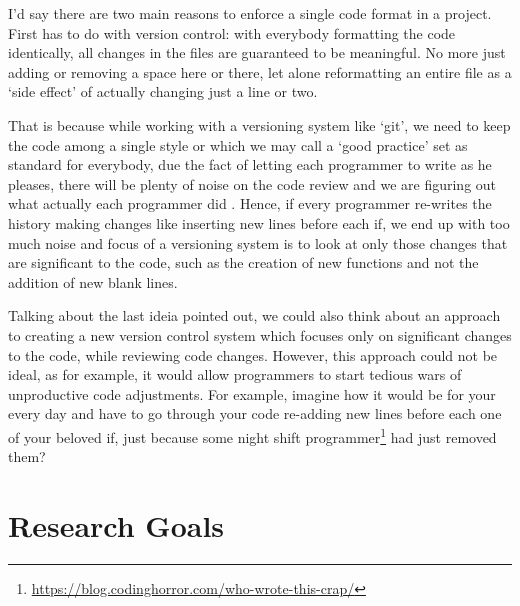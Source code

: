     \begin{citacao}
    I'd say there are two main reasons to enforce a single code format in a project. First has
    to do with version control: with everybody formatting the code identically, all changes in
    the files are guaranteed to be meaningful. No more just adding or removing a space here or
    there, let alone reformatting an entire file as a `side effect' of actually changing just a
    line or two. \cite{Geukens}
    \end{citacao}

    That is because while working with a versioning system like `git', we need
    to keep the code among a single style or which we may call a `good practice'
    set as standard for everybody, due the fact of letting each programmer to
    write as he pleases, there will be plenty of noise on the code review and we
    are figuring out what actually each programmer did \cite{quitDiffCalculating}.
    Hence, if every programmer re-writes the history making changes
    like inserting new lines
    before each if, we end up with too much noise and focus of a versioning
    system is to look at only those changes that are significant to the code,
    such as the creation of new functions and not the addition of new blank
    lines. \cite{findingRegressionsInProjects}

    Talking about the last ideia pointed out, we could also think about an
    approach to creating a new version control system which focuses only on
    significant changes to the code, while reviewing code changes. However, this
    approach could not be ideal, as for example, it would allow programmers to
    start tedious wars of unproductive code adjustments. For example, imagine
    how it would be for your every day and have to go through your code
    re-adding new lines before each one of your beloved if\s, just because some
    night shift programmer\footnote{\url{https://blog.codinghorror.com/who-wrote-this-crap/}}
    had just removed them?



    \section{Research Goals}

